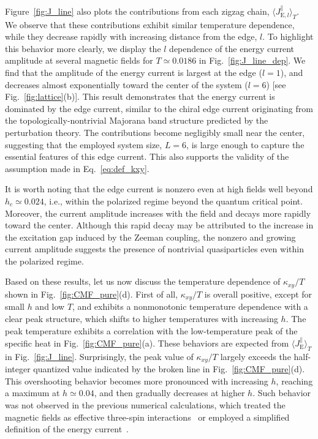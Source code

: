 \documentclass[twocolumn,superscriptaddress,showpacs, longbibliography, aps, prx]{revtex4-2}
\begin{document}
Figure~\ref{fig:J_line} also plots the contributions from each zigzag chain, $\langle J_{\mathrm{E},l}^\parallel \rangle_T$. 
We observe that these contributions exhibit similar temperature dependence, while they decrease rapidly with increasing distance from the edge, $l$. 
To highlight this behavior more clearly, we display the $l$ dependence of the energy current amplitude at several magnetic fields for $T\simeq 0.0186$ in Fig.~\ref{fig:J_line_dep}. 
We find that the amplitude of the energy current is largest at the edge ($l=1$), and decreases almost exponentially toward the center of the system ($l=6$) [see Fig.~\ref{fig:lattice}(b)]. 
This result demonstrates that the energy current is dominated by the edge current, similar to the chiral edge current originating from the topologically-nontrivial Majorana band structure predicted by the perturbation theory.
The contributions become negligibly small near the center, suggesting that the employed system size, $L=6$, is large enough to capture the essential features of this edge current.
This also supports the validity of the assumption made in Eq.~\eqref{eq:def_kxy}. 

It is worth noting that the edge current is nonzero even at high fields well beyond $h_c \simeq 0.024$, i.e., within the polarized regime beyond the quantum critical point. 
Moreover, the current amplitude increases with the field and decays more rapidly toward the center. 
Although this rapid decay may be attributed to the increase in the excitation gap induced by the Zeeman coupling, the nonzero and growing current amplitude suggests the presence of nontrivial quasiparticles even within the polarized regime.

Based on these results, let us now discuss the temperature dependence of $\kappa_{xy}/T$ shown in Fig.~\ref{fig:CMF_pure}(d). First of all, $\kappa_{xy}/T$ is overall positive, except for small $h$ and low $T$, and exhibits a nonmonotonic temperature dependence with a clear peak structure, which shifts to higher temperatures with increasing $h$. 
The peak temperature exhibits a correlation with the low-temperature peak of the specific heat in Fig.~\ref{fig:CMF_pure}(a).
These behaviors are expected from $\langle J_{\mathrm{E}}^\parallel \rangle_T$ in Fig.~\ref{fig:J_line}. 
Surprisingly, the peak value of $\kappa_{xy}/T$ largely exceeds the half-integer quantized value indicated by the broken line in Fig.~\ref{fig:CMF_pure}(d). 
This overshooting behavior becomes more pronounced with increasing $h$, reaching a maximum at $h\simeq 0.04$, and then gradually decreases at higher $h$. 
Such behavior was not observed in the previous numerical calculations, which treated the magnetic fields as effective three-spin interactions~\cite{NasuYM2017} or employed a simplified definition of the energy current~\cite{KumarT2023}. 
\end{document}
